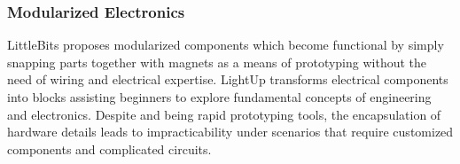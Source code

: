 \subsubsection{Modularized Electronics}

LittleBits \cite{LittleBits} proposes modularized components which become functional by simply snapping parts together with magnets as a means of prototyping without the need of wiring and electrical expertise.
LightUp \cite{LightUp} transforms electrical components into blocks assisting beginners to explore fundamental concepts of engineering and electronics.
Despite \cite{LittleBits} and \cite{LightUp} being rapid prototyping tools, the encapsulation of hardware details leads to impracticability under scenarios that require customized components and complicated circuits.




